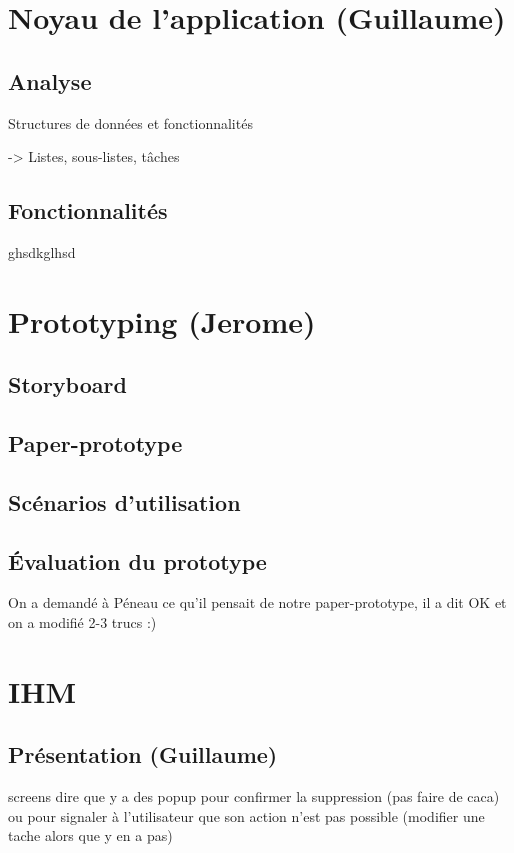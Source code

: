 \chapter{Noyau de l'application (Guillaume)}

	\section{Analyse}

		Structures de données et fonctionnalités
	
		-> Listes, sous-listes, tâches
		
	\section{Fonctionnalités}
	
		ghsdkglhsd
		


\chapter{Prototyping (Jerome)}

	\section{Storyboard}
	
	
	\section{Paper-prototype}
	

	\section{Scénarios d'utilisation}

	
	
	\section{Évaluation du prototype}
		On a demandé à Péneau ce qu'il pensait de notre paper-prototype, il a dit OK et on a modifié 2-3 trucs :)
		


\chapter{IHM}
	
	\section{Présentation (Guillaume)}
		screens
		dire que y a des popup pour confirmer la suppression (pas faire de caca) ou pour signaler à l'utilisateur que son action n'est pas possible (modifier une tache alors que y en a pas)
	
